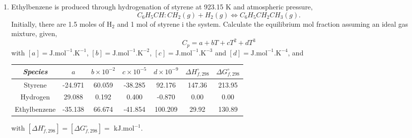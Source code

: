 \documentclass[12pts,a4paper,amsmath,amssymb,floatfix]{article}%
\begin{document}
\begin{enumerate}[label=\bfseries Problem \arabic*:]
\item\label{T06} Ethylbenzene is produced through hydrogenation of styrene at 923.15 K and atmospheric pressure,
     \begin{displaymath}
          C_{6}H_{5}CH:CH_{2} (g) + H_{2} (g) \Longleftrightarrow C_{6}H_{5}CH_{2}CH_{3} (g).
     \end{displaymath}
     Initially, there are 1.5 moles of H$_{2}$ and 1 mol of styrene i the system. Calculate the equilibrium mol fraction assuming an ideal gas mixture, given,
         \begin{displaymath}
            C_{p} = a + bT + cT^{2} + dT^{3}
         \end{displaymath}
         with $[a]=\text{J.mol}^{-1}\text{.K}^{-1}$, $[b]=\text{J.mol}^{-1}\text{.K}^{-2}$, $[c]=\text{J.mol}^{-1}\text{.K}^{-3}$ and $[d]=\text{J.mol}^{-1}\text{.K}^{-4}$, and 
         \begin{center}
            \begin{tabular}{c|c c c c c c}
                \hline
                {\it Species}    & $a$      &  $b\times 10^{-2}$  & $c\times 10^{-5}$ & $d\times 10^{-9}$  & $\Delta H_{f,298}^{\circ}$ & $\Delta G_{f,298}^{\circ}$ \\
                \hline
                Styrene          & -24.971  &   60.059           & -38.285         &  92.176          & 147.36                                                & 213.95                \\
                Hydrogen         &  29.088  &    0.192           &   0.400         &  -0.870          &   0.00                                                &   0.00                \\
                Ethylbenzene     & -35.138  &   66.674           & -41.854         & 100.209          &  29.92                                                & 130.89                \\
                \hline
            \end{tabular}
         \end{center}
         with $\left[\Delta H_{f,298}^{\circ}\right]=\left[\Delta G_{f,298}^{\circ}\right] = \text{ kJ.mol}^{-1}$.

%
\end{enumerate} 
\end{document}
